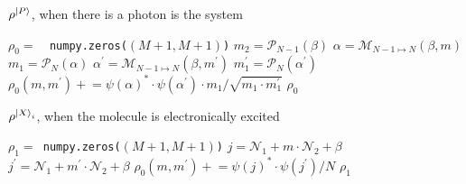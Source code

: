 \documentclass[final,twocolumn]{elsarticle}
\newcommand{\cntset}{\mathcal{P}_N}
\newcommand{\cntsetx}{\mathcal{P}_{N-1}}
\newcommand{\na}{{\mathcal{N}_{1}}}
\newcommand{\nb}{{\mathcal{N}_{2}}}
\newcommand{\maptoN}{{{\mathcal{M}}}_{N-1 \mapsto N}}
\newcommand{\pluseq}{\mathrel{+}=}
\begin{document}
\begin{algorithm}
  \caption{$\rho^{\ket{P}}$, when there is a photon is the system}\label{alg:rho0}
  \begin{algorithmic}[1]
     \State \texttt{$\rho_0 =$\, numpy.zeros($(M+1,M+1)$)} 
     \State \texttt{$m_2=\cntsetx(\beta)$}
      
       \State \texttt{$\alpha = \maptoN(\beta,m)$}
         \State \texttt{$m_1=\cntset(\alpha) $}
      
       \State \texttt{$\alpha^\prime = \maptoN(\beta,m^\prime)$} 
         \State \texttt{$m_1^\prime=\cntset(\alpha^\prime) $}
         \State $\rho_0(m,m^\prime) \pluseq  \psi(\alpha)^\ast \cdot \psi(\alpha^\prime) \cdot m_1/\sqrt{m_1\cdot m_1^\prime}$
       	\EndFor 
        \EndFor  
       \State \Return $\rho_0$
    \EndFunction
  \end{algorithmic}
\end{algorithm}





\begin{algorithm}
  \caption{$\rho^{\ket{X}_i}$, when the molecule is electronically excited}\label{alg:rho1}
  \begin{algorithmic}[1]
     \State \texttt{$\rho_1 = $\,numpy.zeros($(M+1,M+1)$)} 
      
         \State \texttt{$j = \na + m\cdot\nb + \beta $}     
         \State \texttt{$j^\prime = \na + m^\prime\cdot\nb + \beta $}  
         \State $\rho_0(m,m^\prime) \pluseq  \psi(j)^\ast \cdot \psi(j^\prime) /N$
        \EndFor  
        \EndFor 
       \State \Return $\rho_1$
    \EndFunction
  \end{algorithmic}
\end{algorithm}
\end{document}

